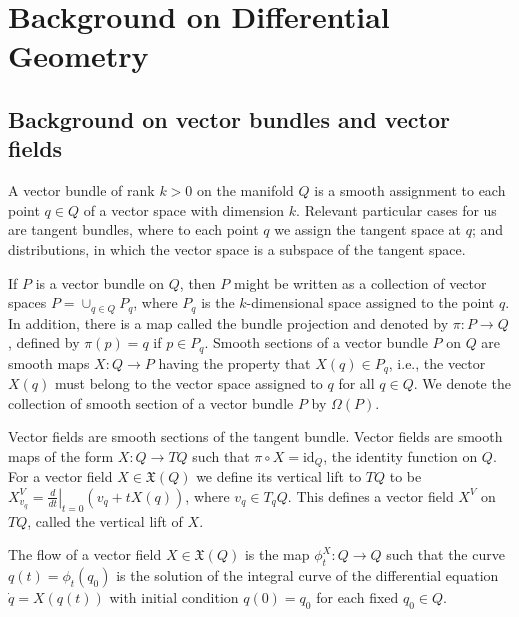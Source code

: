 \documentclass[letterpaper, 10 pt, conference]{ieeeconf}
\begin{document}
\section{Background on Differential Geometry}\label{Sec: background}

\subsection{Background on vector bundles and vector fields}
A vector bundle of rank $k>0$ on the manifold $Q$ is a smooth assignment to each point $q\in Q$ of a vector space with dimension $k$. Relevant particular cases for us are tangent bundles, where to each point $q$ we assign the tangent space at $q$; and distributions, in which the vector space is a subspace of the tangent space. 

If $P$ is a vector bundle on $Q$, then $P$ might be written as a collection of vector spaces $P=\cup_{q\in Q} P_{q}$, where $P_{q}$ is the $k$-dimensional space assigned to the point $q$. In addition, there is a map called the bundle projection and denoted by $\pi:P\to Q$, defined by $\pi(p)=q$ if $p\in P_{q}$. Smooth sections of a vector bundle $P$ on $Q$ are smooth maps $X:Q\to P$ having the property that $X(q)\in P_{q}$, i.e., the vector $X(q)$ must belong to the vector space assigned to $q$ for all $q\in Q$. We denote the collection of smooth section of a vector bundle $P$ by $\Omega(P)$.

Vector fields are smooth sections of the tangent bundle. Vector fields are smooth maps of the form $X: Q \to TQ$ such that $\pi \circ X = \text{id}_Q$, the identity function on $Q$. For a vector field $X\in \mathfrak{X}(Q)$ we define its vertical lift to $TQ$ to be $\displaystyle{X_{v_{q}}^{V}=\left. \frac{d}{dt}\right|_{t=0} (v_{q} + t X(q))}$, where $v_q\in T_qQ$. This defines a vector field $X^V$ on $TQ$, called the vertical lift of $X$. 

The flow of a vector field $X\in \mathfrak{X}(Q)$ is the map $\phi^{X}_{t}:Q \to Q$ such that the curve $q(t)=\phi_{t}(q_0)$ is the solution of the integral curve of the differential equation $\dot{q}=X(q(t))$ with initial condition $q(0)=q_{0}$ for each fixed $q_0\in Q$.
\end{document}

